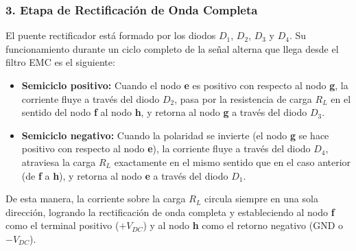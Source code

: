 \documentclass[12pt, a4paper]{article}
\begin{document}
\subsubsection*{3. Etapa de Rectificación de Onda Completa}
El puente rectificador está formado por los diodos $D_1$, $D_2$, $D_3$ y $D_4$. Su funcionamiento durante un ciclo completo de la señal alterna que llega desde el filtro EMC es el siguiente:
\begin{itemize}
    \item \textbf{Semiciclo positivo:} Cuando el nodo \textbf{e} es positivo con respecto al nodo \textbf{g}, la corriente fluye a través del diodo $D_2$, pasa por la resistencia de carga $R_L$ en el sentido del nodo \textbf{f} al nodo \textbf{h}, y retorna al nodo \textbf{g} a través del diodo $D_3$.
    \item \textbf{Semiciclo negativo:} Cuando la polaridad se invierte (el nodo \textbf{g} se hace positivo con respecto al nodo \textbf{e}), la corriente fluye a través del diodo $D_4$, atraviesa la carga $R_L$ exactamente en el mismo sentido que en el caso anterior (de \textbf{f} a \textbf{h}), y retorna al nodo \textbf{e} a través del diodo $D_1$.
\end{itemize}
De esta manera, la corriente sobre la carga $R_L$ circula siempre en una sola dirección, logrando la rectificación de onda completa y estableciendo al nodo \textbf{f} como el terminal positivo ($+V_{DC}$) y al nodo \textbf{h} como el retorno negativo (GND o $-V_{DC}$).
\end{document}
